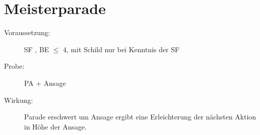 \section{Meisterparade}
\label{reaktion.meisterparade}
\begin{description}
    \item[Voraussetzung:]
    SF , BE\textrm{ ${\leq}$ }4,  mit Schild nur bei Kenntnis der SF 
    \item[Probe:]
        PA + Ansage
    \item[Wirkung:]
        Parade erschwert um Ansage ergibt eine Erleichterung der nächsten Aktion in Höhe der Ansage.
\end{description}
